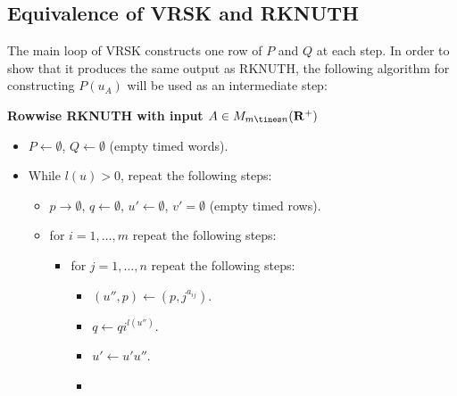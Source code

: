 \documentclass[12pt]{amsart}
\theoremstyle{definition}
\newcommand{\RR}{\mathbf R}
\newcommand{\ot}{\leftarrow}
\begin{document}
\subsection{Equivalence of VRSK and RKNUTH}
\label{sec:equiv-vrsk-rknuth}

The main loop of VRSK constructs one row of $P$ and $Q$ at each step.
In order to show that it produces the same output as RKNUTH, the following algorithm for constructing $P(u_A)$ will be used as an intermediate step:
\begin{center}
  \textbf{Rowwise RKNUTH with input $A\in M_{m\tines n}(\RR^+)$}
  \begin{itemize}
  \item $P\ot \emptyset$, $Q\ot\emptyset$ (empty timed words).
  \item While $l(u)>0$, repeat the following steps:
    \begin{itemize}
    \item $p\to \emptyset$, $q\ot \emptyset$, $u'\ot \emptyset$, $v'=\emptyset$ (empty timed rows).
    \item for $i=1,\dotsc,m$ repeat the following steps:
      \begin{itemize}
      \item for $j=1,\dotsc,n$ repeat the following steps:
        \begin{itemize}
        \item $(u'',p)\ot (p, j^{a_{ij}})$.
        \item $q\ot qi^{l(u'')}$.
        \item $u'\ot u'u''$.
        \item 

        \end{itemize}
      \end{itemize}
    \end{itemize}
  \end{itemize}
\end{center}


\end{document}
